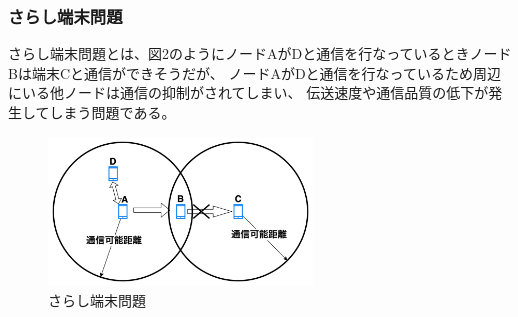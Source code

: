 \documentclass[a4paper, 10pt]{ltjsarticle}
\begin{document}
\subsubsection{さらし端末問題}
さらし端末問題とは、図2のようにノードAがDと通信を行なっているときノードBは端末Cと通信ができそうだが、
ノードAがDと通信を行なっているため周辺にいる他ノードは通信の抑制がされてしまい、
伝送速度や通信品質の低下が発生してしまう問題である。%
\begin{figure}[H]
  \centering
  \includegraphics[width=70mm]{exposed_terminal_problem.png}
  \caption{さらし端末問題}
\end{figure}
\end{document}
